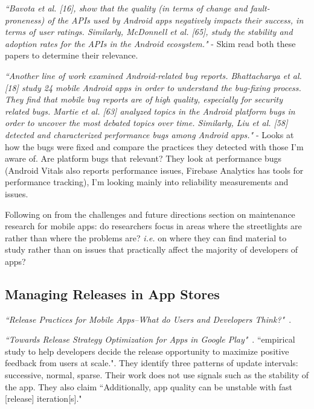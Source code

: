 \emph{``Bavota et al. [16], show that the quality (in terms of change and fault-proneness) of the APIs used by Android apps negatively impacts their success, in terms of user ratings. Similarly, McDonnell et al. [65], study the stability and adoption rates for the APIs in the Android ecosystem."} - Skim read both these papers to determine their relevance.

\emph{``Another line of work examined Android-related bug reports. Bhattacharya et al. [18] study 24 mobile Android apps in order to understand the bug-fixing process. They find that mobile bug reports are of high quality, especially for security related bugs. Martie et al. [63] analyzed topics in the Android platform bugs in order to uncover the most debated topics over time. Similarly, Liu et al. [58] detected and characterized performance bugs among Android apps."} - Looks at how the bugs were fixed and compare the practices they detected with those I'm aware of. Are platform bugs that relevant? They look at performance bugs (Android Vitals also reports performance issues, Firebase Analytics has tools for performance tracking), I'm looking mainly into reliability measurements and issues.

Following on from the challenges and future directions section on maintenance research for mobile apps: do researchers focus in areas where the streetlights are rather than where the problems are? \emph{i.e.} on where they can find material to study rather than on issues that practically affect the majority of developers of apps?




\subsection{Managing Releases in App Stores}

\emph{``Release Practices for Mobile Apps--What do Users and Developers Think?"}~\cite{nayebi2016release}.
    
\emph{``Towards Release Strategy Optimization for Apps in Google Play"}~\citep{shen2017_towards_release_strategy_optimization_for_apps_in_google_play}. ``empirical study to help developers decide the release opportunity to maximize positive feedback from users at scale.". They identify three patterns of update intervals: successive, normal, sparse. Their work does not use signals such as the stability of the app. They also claim ``Additionally, app quality can be unstable with fast [release] iteration[s]."

